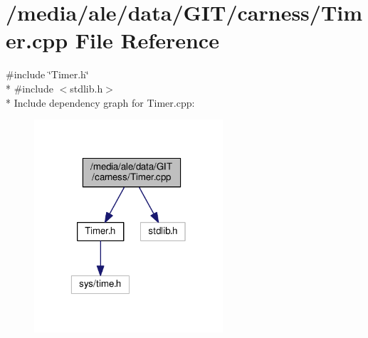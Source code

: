 \hypertarget{a00046}{\section{/media/ale/data/\-G\-I\-T/carness/\-Timer.cpp File Reference}
\label{a00046}
}
{\ttfamily \#include \char`\"{}Timer.\-h\char`\"{}}\\*
{\ttfamily \#include $<$stdlib.\-h$>$}\\*
Include dependency graph for Timer.\-cpp\-:\nopagebreak
\begin{figure}[H]
\begin{center}
\leavevmode
\includegraphics[width=199pt]{a00082}
\end{center}
\end{figure}
